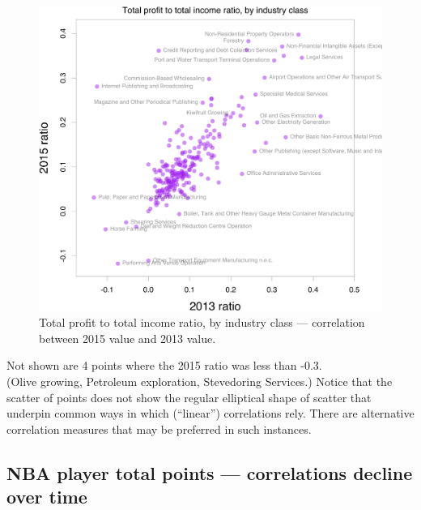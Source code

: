 \documentclass[
  10pt,
  b5paper]{book}
\begin{document}
\begin{figure}[H]

{\centering \includegraphics[width=0.9\linewidth]{07-regress_files/figure-latex/expend-1} 

}

\caption{Total profit to total income ratio, by industry class --- correlation between 2015 value and 2013 value.}\label{fig:expend}
\end{figure}

Not shown are 4 points where the 2015 ratio was less than -0.3.\\
(Olive growing, Petroleum exploration, Stevedoring Services.)
Notice that the scatter of points does not show the regular
elliptical shape of scatter that underpin common ways in which
(``linear'') correlations rely. There are alternative
correlation measures that may be preferred in such instances.

\hypertarget{nba-player-total-points-correlations-decline-over-time}{%
\subsection*{NBA player total points --- correlations decline over time}\label{nba-player-total-points-correlations-decline-over-time}}
\end{document}
